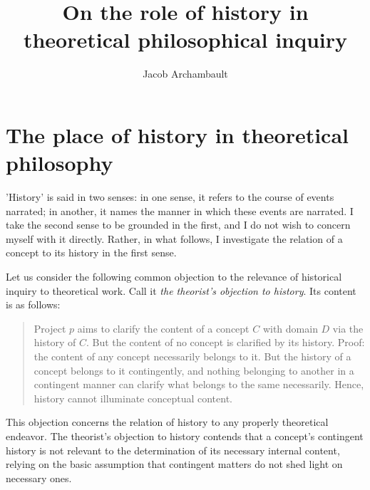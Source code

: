 \documentclass[]{article}
\title{On the role of history in theoretical philosophical inquiry}
\author{Jacob Archambault}
\begin{document}
	
	\maketitle
	
	\begin{abstract}
		
	\end{abstract}

\section{The place of history in theoretical philosophy}
'History' is said in two senses: in one sense, it refers to the course of events narrated; in another, it names the manner in which these events are narrated. I take the second sense to be grounded in the first, and I do not wish to concern myself with it directly. Rather, in what follows, I investigate the relation of a concept to its history in the first sense.

Let us consider the following common objection to the relevance of historical inquiry to theoretical work. Call it \textit{the theorist's objection to history}. Its content is as follows:
\begin{quote}
	Project $p$ aims to clarify the content of a concept $C$ with domain $D$ via the history of $C$. But the content of no concept is clarified by its history. Proof: the content of any concept necessarily belongs to it. But the history of a concept belongs to it contingently, and nothing belonging to another in a contingent manner can clarify what belongs to the same necessarily. Hence, history cannot illuminate conceptual content.
\end{quote}
This objection concerns the relation of history to any properly theoretical endeavor. The theorist's objection to history contends that a concept's contingent history is not relevant to the determination of its necessary internal content, relying on the basic assumption that contingent matters do not shed light on necessary ones.
\end{document}
